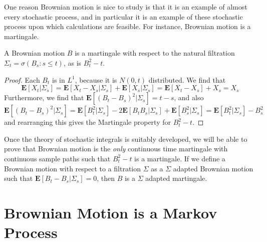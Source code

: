 One reason Brownian motion is nice to study is that it is an example of almost every stochastic process, and in particular it is an example of these stochastic process upon which calculations are feasible. For instance, Brownian motion is a martingale.

\begin{theorem}
    A Brownian motion $B$ is a martingale with respect to the natural filtration $\Sigma_t = \sigma(B_s: s \leq t)$, as is $B_t^2 - t$.
\end{theorem}
\begin{proof}
    Each $B_t$ is in $L^1$, because it is $N(0,t)$ distributed.  We find that
    \[ \mathbf{E}[X_t | \Sigma_s] = \mathbf{E}[X_t - X_s | \Sigma_s] + \mathbf{E}[X_s|\Sigma_s] = \mathbf{E}[X_t - X_s] + X_s = X_s \]
    Furthermore, we find that $\mathbf{E}[(B_t - B_s)^2|\Sigma_s] = t-s$, and also
    \[ \mathbf{E}[(B_t - B_s)^2 | \Sigma_s] = \mathbf{E}[B_t^2|\Sigma_s] - 2\mathbf{E}[B_tB_s|\Sigma_s] + \mathbf{E}[B_s^2|\Sigma_s] = \mathbf{E}[B_t^2|\Sigma_s] - B_s^2 \]
    and rearranging this gives the Martingale property for $B_t^2 - t$.
\end{proof}

Once the theory of stochastic integrals is suitably developed, we will be able to prove that Brownian motion is the {\it only} continuous time martingale with continuous sample paths such that $B_t^2 - t$ is a martingale. If we define a Brownian motion with respect to a filtration $\Sigma$ as a $\Sigma$ adapted Brownian motion such that $\mathbf{E}[B_t - B_s|\Sigma_s] = 0$, then $B$ is a $\Sigma$ adapted martingale.

\section{Brownian Motion is a Markov Process}

